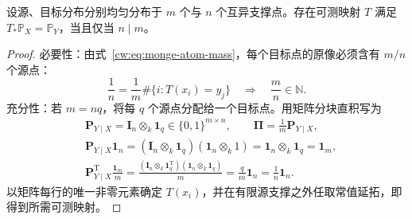 \begin{theorem}[均匀离散分布的整除条件]\label{cw:thm:monge-divisibility}
设源、目标分布分别均匀分布于 $m$ 个与 $n$ 个互异支撑点。存在可测映射 $T$ 满足 $T_*\mathbb P_X=\mathbb P_Y$，当且仅当 $n\mid m$。
\end{theorem}
\begin{proof}
必要性：由式~\eqref{cw:eq:monge-atom-mass}，每个目标点的原像必须含有 $m/n$ 个源点：
\begin{equation}\label{cw:eq:monge-divisibility}
\frac1n=\frac1m\#\{i:T(x_i)=y_j\}
\quad\Longrightarrow\quad\frac mn\in\mathbb N.
\end{equation}
充分性：若 $m=nq$，将每 $q$ 个源点分配给一个目标点。用矩阵分块直积写为
\begin{equation}\label{cw:eq:monge-construction}
\begin{aligned}
&\bm P_{Y\mid X}=\bm I_n\otimes_k\mathbf1_q\in\{0,1\}^{m\times n},
\qquad\bm\Pi=\frac1m\bm P_{Y\mid X},\\
&\bm P_{Y\mid X}\mathbf1_n
=(\bm I_n\otimes_k\mathbf1_q)(\mathbf1_n\otimes_k1)
=\mathbf1_n\otimes_k\mathbf1_q=\mathbf1_m,\\
&\bm P_{Y\mid X}^{\mathrm T}\frac{\mathbf1_m}{m}
=\frac{(\bm I_n\otimes_k\mathbf1_q^{\mathrm T})(\mathbf1_n\otimes_k\mathbf1_q)}m
=\frac q m\mathbf1_n=\frac1n\mathbf1_n.
\end{aligned}
\end{equation}
以矩阵每行的唯一非零元素确定 $T(x_i)$，并在有限源支撑之外任取常值延拓，即得到所需可测映射。
\end{proof}
